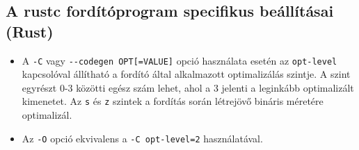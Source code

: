 \subsection{A rustc fordítóprogram specifikus beállításai (Rust)}
\begin{itemize}
  \item A \lstinline{-C} vagy \lstinline{--codegen OPT[=VALUE]} opció használata esetén az \lstinline{opt-level} kapcsolóval állítható a fordító által alkalmazott optimalizálás szintje. A szint egyrészt 0-3 közötti egész szám lehet, ahol a 3 jelenti a leginkább optimalizált kimenetet. Az \lstinline{s} és \lstinline{z} szintek a fordítás során létrejövő bináris méretére optimalizál.
  \item Az \lstinline{-O} opció ekvivalens a \lstinline{-C opt-level=2} használatával.
\end{itemize}
